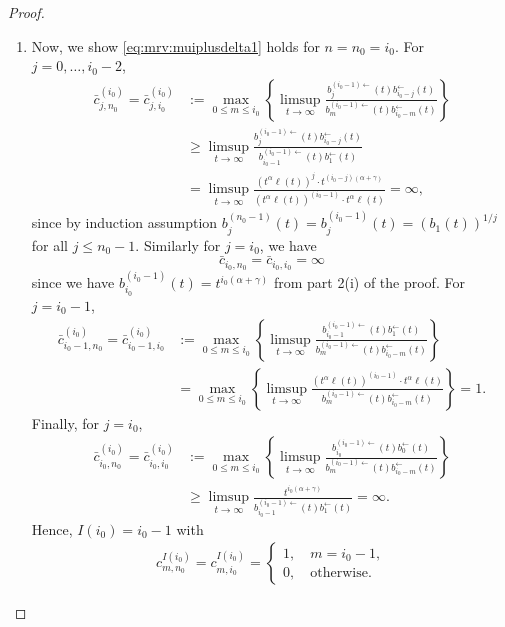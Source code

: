 \documentclass[aos]{imsart}
\numberwithin{equation}{section}
\theoremstyle{plain} %
\theoremstyle{remark}
\begin{document}
\begin{proof}
\begin{enumerate}[(1)]
\item[(ii)] Now, we show \eqref{eq:mrv:muiplusdelta1} holds for $n= n_0= i_0$.  For $j=0,\ldots,i_0-2$,
\begin{align*}
\bar{c}_{j,n_0}^{(i_0)}=\bar{c}_{j,i_0}^{(i_0)}&:=\max_{0\le m\le i_0}\left\{\limsup_{t\to\infty} \frac{b_{j}^{(i_0-1)\leftarrow}(t)b_{i_0-j}^{\leftarrow}(t)}{b_{m}^{(i_0-1)\leftarrow}(t)b_{i_0-m}^{\leftarrow}(t)} \right\} \\
& \ge \limsup_{t\to\infty} \frac{b_{j}^{(i_0-1)\leftarrow}(t)b_{i_0-j}^{\leftarrow}(t)}{b_{i_0-1}^{(i_0-1)\leftarrow}(t)b_{1}^{\leftarrow}(t)} \\ & = \limsup_{t\to\infty} \frac{(t^\alpha\ell(t))^j\cdot t^{(i_0-j)(\alpha+\gamma)}}{(t^{\alpha}\ell(t))^{(i_0-1)}\cdot t^{\alpha}\ell(t)} =\infty,
\end{align*}
since by induction assumption  $b_j^{(n_0-1)}(t)= b_j^{(i_0-1)}(t)=(b_1(t))^{1/j}$ for all $j\le n_0-1$. Similarly for $j=i_0$, we have
$$\bar{c}_{i_0,n_0}=\bar{c}_{i_0,i_0}=\infty$$ since we have $b_{i_0}^{(i_0-1)}(t)=t^{i_0(\alpha+\gamma)}$ from part 2(i) of the proof. For $j=i_0-1$,
 \begin{align*}
\bar{c}_{i_0-1,n_0}^{(i_0)} = \bar{c}_{i_0-1,i_0}^{(i_0)}&:=\max_{0\le m\le i_0}\left\{\limsup_{t\to\infty} \frac{b_{i_0-1}^{(i_0-1)\leftarrow}(t)b_{1}^{\leftarrow}(t)}{b_{m}^{(i_0-1)\leftarrow}(t)b_{i_0-m}^{\leftarrow}(t)} \right\} \\
& = \max_{0\le m\le i_0} \left\{\limsup_{t\to\infty} \frac{(t^{\alpha}\ell(t))^{(i_0-1)}\cdot t^{\alpha}\ell(t)}{b_{m}^{(i_0-1)\leftarrow}(t)b_{i_0-m}^{\leftarrow}(t)}\right\} = 1.
\end{align*}
Finally, for $j=i_0$,
 \begin{align*}
\bar{c}_{i_0,n_0}^{(i_0)} = \bar{c}_{i_0,i_0}^{(i_0)}&:=\max_{0\le m\le i_0}\left\{\limsup_{t\to\infty} \frac{b_{i_0}^{(i_0-1)\leftarrow}(t)b_{0}^{\leftarrow}(t)}{b_{m}^{(i_0-1)\leftarrow}(t)b_{i_0-m}^{\leftarrow}(t)} \right\} \\
&  \ge \limsup_{t\to\infty} \frac{t^{i_0(\alpha+\gamma)}}{b_{i_0-1}^{(i_0-1)\leftarrow}(t)b_{1}^{\leftarrow}(t)} = \infty.
\end{align*}
Hence, $I(i_0)=i_0-1$ with
\begin{align*}
c_{m,n_0}^{I(i_0)}= c_{m,i_0}^{I(i_0)} =\begin{cases}
    1, \quad m=i_0-1,\\
    0, \quad \text{otherwise}.
\end{cases}
\end{align*}

\end{enumerate}
\end{proof}
\end{document}
